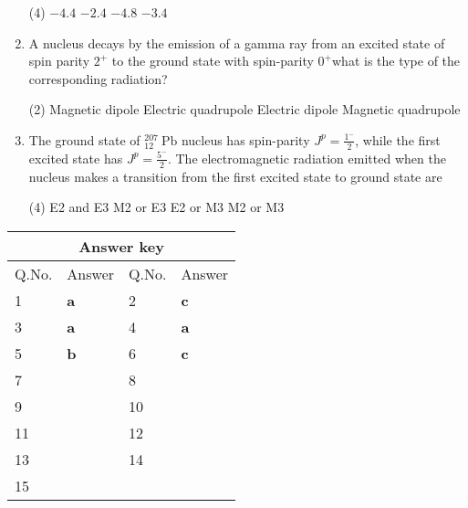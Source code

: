 \begin{enumerate}
	{}
	 \begin{tasks}(4)
		\task[\textbf{a.}]$-4.4$
		\task[\textbf{b.}]$-2.4$
		\task[\textbf{c.}]$-4.8$
		\task[\textbf{d.}]$-3.4$
	\end{tasks}
\item A nucleus decays by the emission of a gamma ray from an excited state of spin parity $2^{+}$ to the ground state with spin-parity $0^{+}$what is the type of the corresponding radiation?
{}
 \begin{tasks}(2)
	\task[\textbf{a.}]Magnetic dipole
	\task[\textbf{b.}]Electric quadrupole
	\task[\textbf{c.}]Electric dipole
	\task[\textbf{d.}]Magnetic quadrupole 
\end{tasks}
\item The ground state of ${ }_{12}^{207} \mathrm{~Pb}$ nucleus has spin-parity $J^p=\frac{1^{-}}{2}$, while the first excited state has $J^p=\frac{5^{-}}{2}$. The electromagnetic radiation emitted when the nucleus makes a transition from the first excited state to ground state are
{}
 \begin{tasks}(4)
	\task[\textbf{a.}]E2 and E3
	\task[\textbf{b.}]M2 or E3
	\task[\textbf{c.}]E2 or M3
	\task[\textbf{d.}]M2 or M3 
\end{tasks}
\end{enumerate}
\setlength\arrayrulewidth{1pt}
\begin{table}[H]
	\centering
	\begin{tabular}{|p{1.5cm}|p{1.5cm}||p{1.5cm}|p{1.5cm}|}
		\hline
		\multicolumn{4}{|c|}{\textbf{Answer key}}\\\hline\hline
		\rowcolor{ocrel}Q.No.&Answer&Q.No.&Answer\\\hline
		1&\textbf{a} &2&\textbf{c}\\\hline 
		3&\textbf{a} &4&\textbf{a} \\\hline
		5&\textbf{b} &6&\textbf{c} \\\hline
		7&\textbf{}&8&\textbf{}\\\hline
		9&\textbf{}&10&\textbf{}\\\hline
		11&\textbf{} &12&\textbf{}\\\hline
		13&\textbf{}&14&\textbf{}\\\hline
		15&\textbf{}& &\\\hline
		
	\end{tabular}
\end{table}


